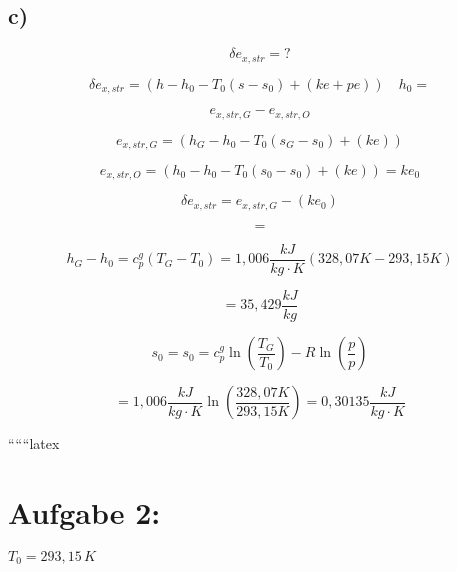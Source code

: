 

\subsection*{c)}

\[
\delta e_{x,str} = ?
\]

\[
\delta e_{x,str} = (h - h_0 - T_0 (s - s_0) + (ke + pe)) \quad h_0 =
\]

\[
e_{x,str,G} - e_{x,str,O}
\]

\[
e_{x,str,G} = (h_G - h_0 - T_0 (s_G - s_0) + (ke))
\]

\[
e_{x,str,O} = (h_0 - h_0 - T_0 (s_0 - s_0) + (ke)) = ke_0
\]

\[
\delta e_{x,str} = e_{x,str,G} - (ke_0)
\]

\[
=
\]

\[
h_G - h_0 = c_p^g (T_G - T_0) = 1,006 \frac{kJ}{kg \cdot K} (328,07K - 293,15K)
\]

\[
= 35,429 \frac{kJ}{kg}
\]

\[
s_0 = s_0 = c_p^g \ln \left( \frac{T_G}{T_0} \right) - R \ln \left( \frac{p}{p} \right)
\]

\[
= 1,006 \frac{kJ}{kg \cdot K} \ln \left( \frac{328,07K}{293,15K} \right) = 0,30135 \frac{kJ}{kg \cdot K}
\]

``````latex


\section*{Aufgabe 2:}
$T_0 = 293,15 \, K$